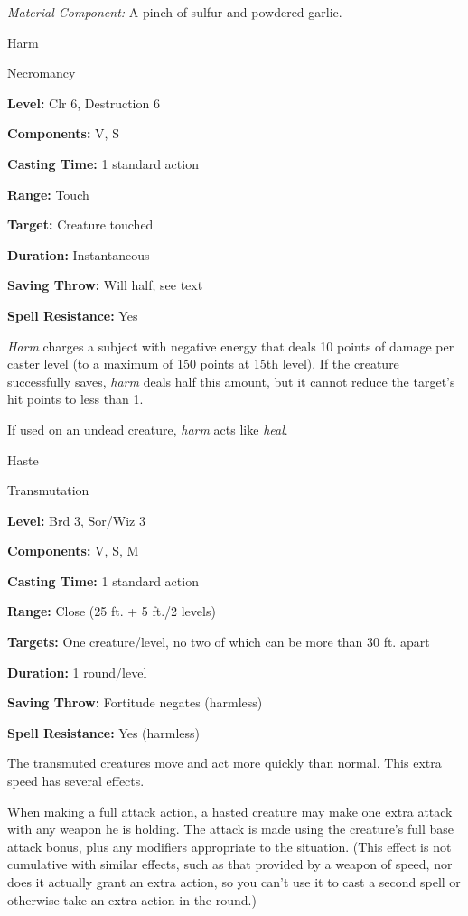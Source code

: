 \documentclass{article}
\begin{document}
\textit{Material Component: }A pinch of sulfur and powdered garlic.

\vspace{12pt}
Harm

Necromancy

\textbf{Level:} Clr 6, Destruction 6

\textbf{Components:} V, S

\textbf{Casting Time:} 1 standard action

\textbf{Range:} Touch

\textbf{Target:} Creature touched

\textbf{Duration:} Instantaneous

\textbf{Saving Throw: }Will half; see text

\textbf{Spell Resistance:} Yes

\textit{Harm }charges a subject with negative energy that deals 10 points of damage 
per caster level (to a maximum of 150 points at 15th level). If the creature successfully 
saves, \textit{harm }deals half this amount, but it cannot reduce the target's 
hit points to less than 1.

If used on an undead creature, \textit{harm }acts like \textit{heal}.

\vspace{12pt}
Haste

Transmutation

\textbf{Level:} Brd 3, Sor/Wiz 3

\textbf{Components:} V, S, M

\textbf{Casting Time:} 1 standard action

\textbf{Range:} Close (25 ft. + 5 ft./2 levels)

\textbf{Targets:} One creature/level, no two of which can be more than 30 ft. apart

\textbf{Duration:} 1 round/level

\textbf{Saving Throw:} Fortitude negates (harmless)

\textbf{Spell Resistance:} Yes (harmless)

The transmuted creatures move and act more quickly than normal. This extra speed 
has several effects.

When making a full attack action, a hasted creature may make one extra attack with 
any weapon he is holding. The attack is made using the creature's full base attack 
bonus, plus any modifiers appropriate to the situation. (This effect is not cumulative 
with similar effects, such as that provided by a weapon of speed, nor does it actually 
grant an extra action, so you can't use it to cast a second spell or otherwise 
take an extra action in the round.)
\end{document}
